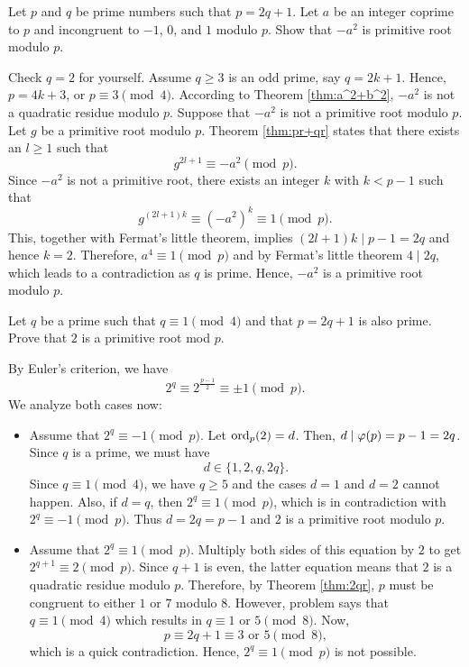 \documentclass{subfile}
\begin{document}
	\begin{problem}
		Let $p$ and $q$ be prime numbers such that $ p=2q+1$. Let $a$ be an integer coprime to $p$ and incongruent to $-1$, $0$, and $1$ modulo $p$. Show that $ -a^2$ is primitive root modulo $p$.
	\end{problem}
	
	\begin{solution}
		Check $ q=2$ for yourself. Assume $ q \ge 3$ is an odd prime, say $q=2k+1$. Hence, $ p=4k+3$, or $p \equiv 3 \pmod 4$. According to Theorem \ref{thm:a^2+b^2}, $ -a^2$ is not a quadratic residue modulo $ p$. Suppose that $ -a^2$ is not a primitive root modulo $p$. Let $ g$ be a primitive root modulo $p$. Theorem \ref{thm:pr+qr} states that there exists an $ l\ge 1$ such that $$g^{2l+1} \equiv -a^2 \pmod p.$$ Since $-a^2$ is not a primitive root, there exists an integer $k$ with $ k<p-1$ such that \[g^{(2l+1)k} \equiv (-a^2)^k \equiv 1 \pmod p .\] This, together with Fermat's little theorem, implies $ (2l+1)k \mid p-1=2q$ and hence $ k=2$. Therefore, $ a^4 \equiv 1 \pmod p$ and by Fermat's little theorem $ 4\mid 2q$, which leads to a contradiction as $q$ is prime. Hence, $ -a^2$ is a primitive root modulo $p$.
	\end{solution}
	
	\begin{problem}
		Let $q$ be a prime such that $q\equiv 1\pmod 4$ and that $p=2q+1$ is also prime. Prove that $2$ is a primitive root mod $p$.
	\end{problem}
	
	\begin{solution}
		By Euler's criterion, we have
		\[2^q \equiv 2^{\frac{p-1}{2}} \equiv \pm 1 \pmod{p}.\]
		 We analyze both cases now:
			\begin{itemize}
				\item Assume that $2^q \equiv -1 \pmod p$. Let $\operatorname{ord}_p(2)=d$. Then, $d\mid \varphi(p)=p-1=2q$. Since $q$ is a prime, we must have $$d \in \{1,2,q,2q\}.$$ Since $q \equiv 1 \pmod 4$, we have $q \geq 5$ and the cases $d=1$ and $d=2$ cannot happen. Also, if $d=q$, then $2^q \equiv 1 \pmod p$, which is in contradiction with $2^q \equiv -1 \pmod p$. Thus $d=2q=p-1$ and $2$ is a primitive root modulo $p$.
				\item Assume that $2^q \equiv 1 \pmod{p}$. Multiply both sides of this equation by $2$ to get $2^{q+1} \equiv 2 \pmod p$. Since $q+1$ is even, the latter equation means that $2$ is a quadratic residue modulo $p$. Therefore, by Theorem \ref{thm:2qr}, $p$ must be congruent to either $1$ or $7$ modulo $8$. However, problem says that $q \equiv 1 \pmod 4$ which results in $q \equiv 1$ or $5 \pmod 8$. Now,
				\[p \equiv 2q +1 \equiv 3 \text{ or } 5 \pmod 8,\]
				which is a quick contradiction. Hence, $2^q \equiv 1 \pmod{p}$ is not possible.
			\end{itemize}

	\end{solution}
	
\end{document}
